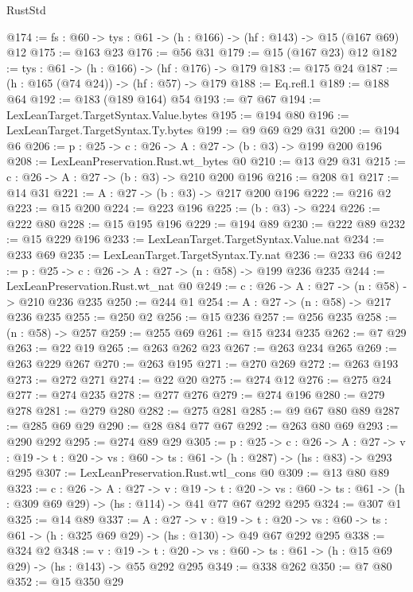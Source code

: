 \begin{lexlean}{RustStd}
\begin{coremodule}
@174 := {fs : @60} -> {tys : @61} -> (h : @166) -> (hf : @143) -> @15 (@167 @69) @12
@175 := @163 @23
@176 := @56 @31
@179 := @15 (@167 @23) @12
@182 := {tys : @61} -> (h : @166) -> (hf : @176) -> @179
@183 := @175 @24
@187 := (h : @165 (@74 @24)) -> (hf : @57) -> @179
@188 := Eq.refl.{1}
@189 := @188 @64
@192 := @183 (@189 @164) @54
@193 := @7 @67
@194 := LexLeanTarget.TargetSyntax.Value.bytes
@195 := @194 @80
@196 := LexLeanTarget.TargetSyntax.Ty.bytes
@199 := @9 @69 @29 @31
@200 := @194 @6
@206 := {p : @25} -> {c : @26} -> {A : @27} -> (b : @3) -> @199 @200 @196
@208 := LexLeanPreservation.Rust.wt_bytes @0
@210 := @13 @29 @31
@215 := {c : @26} -> {A : @27} -> (b : @3) -> @210 @200 @196
@216 := @208 @1
@217 := @14 @31
@221 := {A : @27} -> (b : @3) -> @217 @200 @196
@222 := @216 @2
@223 := @15 @200
@224 := @223 @196
@225 := (b : @3) -> @224
@226 := @222 @80
@228 := @15 @195 @196
@229 := @194 @89
@230 := @222 @89
@232 := @15 @229 @196
@233 := LexLeanTarget.TargetSyntax.Value.nat
@234 := @233 @69
@235 := LexLeanTarget.TargetSyntax.Ty.nat
@236 := @233 @6
@242 := {p : @25} -> {c : @26} -> {A : @27} -> (n : @58) -> @199 @236 @235
@244 := LexLeanPreservation.Rust.wt_nat @0
@249 := {c : @26} -> {A : @27} -> (n : @58) -> @210 @236 @235
@250 := @244 @1
@254 := {A : @27} -> (n : @58) -> @217 @236 @235
@255 := @250 @2
@256 := @15 @236
@257 := @256 @235
@258 := (n : @58) -> @257
@259 := @255 @69
@261 := @15 @234 @235
@262 := @7 @29
@263 := @22 @19
@265 := @263 @262 @23
@267 := @263 @234 @265
@269 := @263 @229 @267
@270 := @263 @195
@271 := @270 @269
@272 := @263 @193
@273 := @272 @271
@274 := @22 @20
@275 := @274 @12
@276 := @275 @24
@277 := @274 @235
@278 := @277 @276
@279 := @274 @196
@280 := @279 @278
@281 := @279 @280
@282 := @275 @281
@285 := @9 @67 @80 @89
@287 := @285 @69 @29
@290 := @28 @84 @77 @67
@292 := @263 @80 @69
@293 := @290 @292
@295 := @274 @89 @29
@305 := {p : @25} ->
  {c : @26} ->
  {A : @27} ->
  {v : @19} -> {t : @20} -> {vs : @60} -> {ts : @61} -> (h : @287) -> (hs : @83) -> @293 @295
@307 := LexLeanPreservation.Rust.wtl_cons @0
@309 := @13 @80 @89
@323 := {c : @26} ->
  {A : @27} ->
  {v : @19} ->
  {t : @20} ->
  {vs : @60} -> {ts : @61} -> (h : @309 @69 @29) -> (hs : @114) -> @41 @77 @67 @292 @295
@324 := @307 @1
@325 := @14 @89
@337 := {A : @27} ->
  {v : @19} ->
  {t : @20} -> {vs : @60} -> {ts : @61} -> (h : @325 @69 @29) -> (hs : @130) -> @49 @67 @292 @295
@338 := @324 @2
@348 := {v : @19} ->
  {t : @20} -> {vs : @60} -> {ts : @61} -> (h : @15 @69 @29) -> (hs : @143) -> @55 @292 @295
@349 := @338 @262
@350 := @7 @80
@352 := @15 @350 @29

\end{coremodule}
\end{lexlean}
